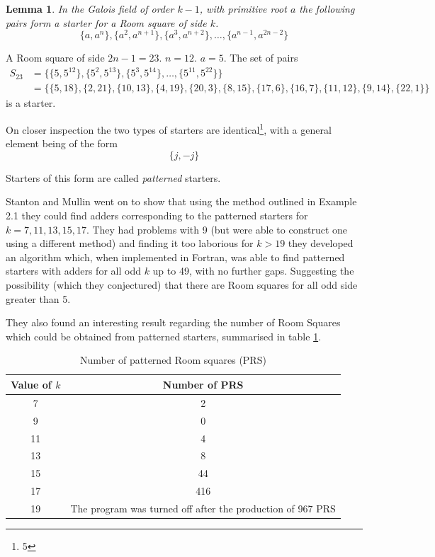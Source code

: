 \documentclass[
  11pt,
  a4paper]{book}
\newtheorem{lemma}[theorem]{Lemma}
\newcounter{example}
\begin{document}
\begin{lemma}
In the Galois field of order $k - 1$, with primitive root
$a$ the following pairs form a starter for a Room square of
side $k$.
\begin{equation}
  \{a, a^n\}, \{a^2, a^{n + 1}\}, \{a^3, a^{n + 2}\}, \ldots, \{a^{n - 1}, a^{2n - 2}\}
\end{equation}
\end{lemma}

\begin{example}
A Room square of side $2n - 1 = 23$. $n = 12$. $a = 5$.
The set of pairs
\begin{equation*}
\begin{split}
S_{23} &= \{\{5, 5^{12}\}, \{5^2, 5^{13}\}, \{5^3, 5^{14}\}, \ldots, \{5^{11}, 5^{22}\}\} \\
       &= \{\{5, 18\}, \{2, 21\}, \{10, 13\}, \{4, 19\}, \{20, 3\}, \{8, 15\}, \{17, 6\}, \{16, 7\}, \{11, 12\}, \{9, 14\}, \{22, 1\}\}
\end{split}
\end{equation*}
is a starter.
\end{example}

On closer inspection the two types of starters are identical\footnote{5},
with a general element being of the form \[\{j,-j\}\]

Starters of this form are called \emph{patterned} starters.

Stanton and Mullin went on to show that using the method outlined in
Example 2.1 they could find adders corresponding to the patterned
starters for \(k = 7, 11, 13, 15, 17\). They had problems with 9 (but
were able to construct one using a different method) and finding it too
laborious for \(k > 19\) they developed an algorithm which, when
implemented in Fortran, was able to find patterned starters with adders
for all odd \(k\) up to 49, with no further gaps. Suggesting the
possibility (which they conjectured) that there are Room squares for all
odd side greater than 5.

They also found an interesting result regarding the number of Room
Squares which could be obtained from patterned starters, summarised in
table \ref{tab:patterned}.

\begin{table}[h!]
  \begin{center}
    \caption{Number of patterned Room squares (PRS)}
    \label{tab:patterned}
    \begin{tabular}{c|c}
    Value of $k$ & Number of PRS \\ \hline
    7 & 2 \\
    9 & 0 \\
    11 & 4 \\
    13 & 8 \\
    15 & 44 \\
    17 & 416 \\
    19 & The program was turned off after the production of 967 PRS
    \end{tabular}
  \end{center}
\end{table}
\end{document}

